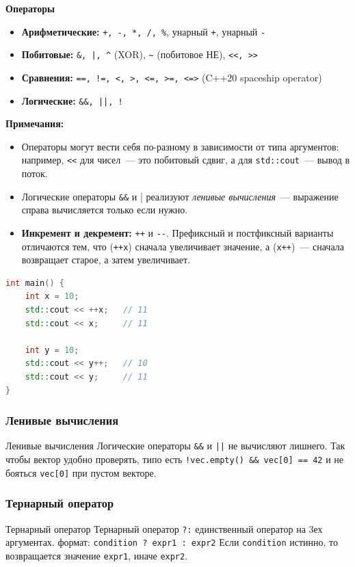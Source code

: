 \textbf{Операторы}
\begin{itemize}
  \item \textbf{Арифметические:} \verb|+, -, *, /, %|, унарный \verb|+|, унарный \verb|-|
  \item \textbf{Побитовые:} \verb!&, |, ^! (XOR), \verb!~! (побитовое НЕ), \verb!<<, >>!
  \item \textbf{Сравнения:} \verb|==, !=, <, >, <=, >=, <=>| (C++20 spaceship operator)
  \item \textbf{Логические:} \verb+&&, ||, !+
\end{itemize}

\textbf{Примечания:}
\begin{itemize}
  \item Операторы могут вести себя по-разному в зависимости от типа аргументов: например, \verb|<<| для чисел~--- это побитовый сдвиг, а для \verb|std::cout|~--- вывод в поток.
  \item Логические операторы \verb|&&| и \verb||| реализуют \textit{ленивые вычисления}~--- выражение справа вычисляется только если нужно.
  \item \textbf{Инкремент и декремент:} \verb|++| и \verb|--|. Префиксный и постфиксный варианты отличаются тем, что (\verb|++x|) сначала увеличивает значение, а (\verb|x++|)~--- сначала возвращает старое, а затем увеличивает.
\end{itemize}

\begin{lstlisting}[language=C++]
int main() {
    int x = 10;
    std::cout << ++x;   // 11
    std::cout << x;     // 11

    int y = 10;
    std::cout << y++;   // 10
    std::cout << y;     // 11
}
\end{lstlisting}

\subsubsection{Ленивые вычисления}
\begin{definition}
{Ленивые вычисления}{}
Логические операторы \texttt{\&\&} и \texttt{||} не вычисляют лишнего.
Так чтобы вектор удобно проверять, типо есть \texttt{!vec.empty() \&\& vec[0] == 42} и не бояться \texttt{vec[0]} при пустом векторе.
\end{definition}
\subsubsection{Тернарный оператор}
\begin{definition}{Тернарный оператор}{}
Тернарный оператор \texttt{?:} единственный оператор на 3ех аргументах. \newline
формат: \texttt{condition ? expr1 : expr2}
Если \texttt{condition} истинно, то возвращается значение \texttt{expr1}, иначе \texttt{expr2}.
\end{definition}
